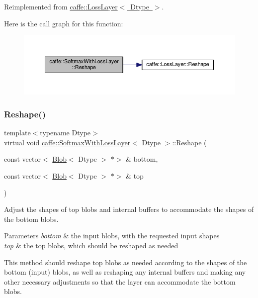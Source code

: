 Reimplemented from \mbox{\hyperlink{classcaffe_1_1_loss_layer_abf00412194f5413ea9468ee44b0d986f}{caffe\+::\+Loss\+Layer$<$ Dtype $>$}}.

Here is the call graph for this function\+:
\nopagebreak
\begin{figure}[H]
\begin{center}
\leavevmode
\includegraphics[width=350pt]{classcaffe_1_1_softmax_with_loss_layer_a2821b89b0f46a5e2ddaccb2708ab237b_cgraph}
\end{center}
\end{figure}
\mbox{\label{classcaffe_1_1_softmax_with_loss_layer_ad8f5d429254deaebe4ea5f14bfa0d4d0}} 
\subsubsection{\texorpdfstring{Reshape()}{Reshape()}\hspace{0.1cm}{\footnotesize\ttfamily [2/2]}}
{\footnotesize\ttfamily template$<$typename Dtype$>$ \\
virtual void \mbox{\hyperlink{classcaffe_1_1_softmax_with_loss_layer}{caffe\+::\+Softmax\+With\+Loss\+Layer}}$<$ Dtype $>$\+::Reshape (\begin{DoxyParamCaption}\item[{const vector$<$ \mbox{\hyperlink{classcaffe_1_1_blob}{Blob}}$<$ Dtype $>$ $\ast$$>$ \&}]{bottom,  }\item[{const vector$<$ \mbox{\hyperlink{classcaffe_1_1_blob}{Blob}}$<$ Dtype $>$ $\ast$$>$ \&}]{top }\end{DoxyParamCaption})\hspace{0.3cm}{\ttfamily [virtual]}}



Adjust the shapes of top blobs and internal buffers to accommodate the shapes of the bottom blobs. 


\begin{DoxyParams}{Parameters}
{\em bottom} & the input blobs, with the requested input shapes \\
\hline
{\em top} & the top blobs, which should be reshaped as needed\\
\hline
\end{DoxyParams}
This method should reshape top blobs as needed according to the shapes of the bottom (input) blobs, as well as reshaping any internal buffers and making any other necessary adjustments so that the layer can accommodate the bottom blobs. 

